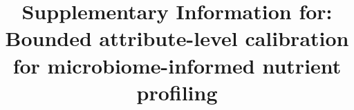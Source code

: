\documentclass[pdflatex,sn-nature]{sn-jnl}
\begin{document}
\title{Supplementary Information for: Bounded attribute-level calibration for microbiome-informed nutrient profiling}
\maketitle

\setcounter{section}{0}
\setcounter{subsection}{0}
\setcounter{equation}{0}
\setcounter{figure}{0}
\setcounter{table}{0}
\renewcommand{\thesection}{S\arabic{section}}
\renewcommand{\thesubsection}{\thesection.\arabic{subsection}}
\renewcommand{\theequation}{S\arabic{equation}}
\renewcommand{\thefigure}{S\arabic{figure}}
\renewcommand{\thetable}{S\arabic{table}}


\clearpage

\end{document}
